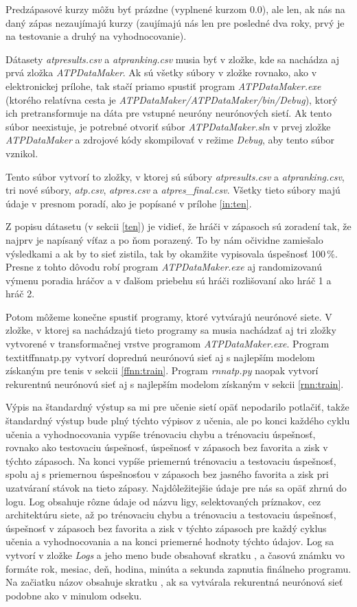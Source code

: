 Predzápasové kurzy môžu byť prázdne (vyplnené kurzom 0.0), ale len, ak nás na daný zápas nezaujímajú kurzy (zaujímajú nás len pre posledné dva roky, prvý je na testovanie a druhý na vyhodnocovanie).

Dátasety \textit{atpresults.csv} a \textit{atpranking.csv} musia byť v zložke, kde sa nachádza aj prvá zložka \textit{ATPDataMaker}.
Ak sú všetky súbory v zložke rovnako, ako v elektronickej prílohe, tak stačí priamo spustiť program \textit{ATPDataMaker.exe} (ktorého relatívna cesta je \textit{ATPDataMaker/ATPDataMaker/bin/Debug}), ktorý ich pretransformuje na dáta pre vstupné neuróny neurónových sietí. 
Ak tento súbor neexistuje, je potrebné otvoriť súbor \textit{ATPDataMaker.sln} v prvej zložke \textit{ATPDataMaker} a zdrojové kódy skompilovať v režime \textit{Debug}, aby tento súbor vznikol.

Tento súbor vytvorí to zložky, v ktorej sú súbory \textit{atpresults.csv} a 
\textit{atpranking.csv}, tri nové súbory, 
\textit{atp.csv}, 
\textit{atpres.csv} a 
\textit{atpres\_final.csv}. 
Všetky tieto súbory majú údaje v presnom poradí, ako je popísané v prílohe \ref{in:ten}.

Z popisu dátasetu (v sekcii \ref{ten}) je vidieť, že hráči v zápasoch sú zoradení tak, že najprv je napísaný víťaz a po ňom porazený. To by nám očividne zamiešalo výsledkami a ak by to sieť zistila, tak by okamžite vypisovala úspešnosť 100\,\%.
Presne z tohto dôvodu robí program \textit{ATPDataMaker.exe} aj randomizovanú výmenu poradia hráčov a v ďalšom priebehu sú hráči rozlišovaní ako hráč 1 a hráč 2.

Potom môžeme konečne spustiť programy, ktoré vytvárajú neurónové siete.
V zložke, v ktorej sa nachádzajú tieto programy sa musia nachádzať aj tri zložky vytvorené v transformačnej vrstve programom \textit{ATPDataMaker.exe}.
Program textit{ffnnatp.py} vytvorí doprednú neurónovú sieť aj s najlepším modelom získaným pre tenis v sekcii \ref{ffnn:train}.
Program \textit{rnnatp.py} naopak vytvorí rekurentnú neurónovú sieť aj s najlepším modelom získaným v sekcii \ref{rnn:train}.

Výpis na štandardný výstup sa mi pre učenie sietí opäť nepodarilo potlačiť, takže štandardný výstup bude plný týchto výpisov z učenia, ale po konci každého cyklu učenia a vyhodnocovania vypíše trénovaciu chybu a trénovaciu úspešnosť, rovnako ako testovaciu úspešnosť, úspešnosť v zápasoch bez favorita a zisk v týchto zápasoch.
Na konci vypíše priemernú trénovaciu a testovaciu úspešnosť, spolu aj s priemernou úspešnosťou v zápasoch bez jasného favorita a zisk pri uzatváraní stávok na tieto zápasy. 
Najdôležitejšie údaje pre nás sa opäť zhrnú do logu. 
Log obsahuje rôzne údaje od názvu ligy, selektovaných príznakov, cez architektúru siete, až po trénovaciu chybu a trénovaciu a testovaciu úspešnosť, úspešnosť v zápasoch bez favorita a zisk v týchto zápasoch pre každý cyklus učenia a vyhodnocovania a na konci priemerné hodnoty týchto údajov.
Log sa vytvorí v zložke \textit{Logs} a jeho meno bude obsahovať skratku ,  a časovú známku vo formáte rok, mesiac, deň, hodina, minúta a sekunda zapnutia finálneho programu. Na začiatku názov obsahuje skratku , ak sa vytvárala rekurentná neurónová sieť podobne ako v minulom odseku.
